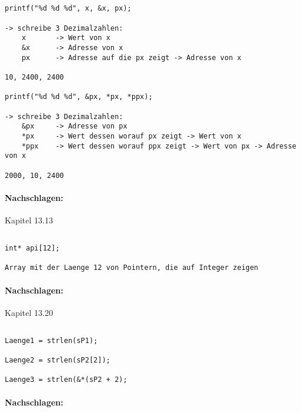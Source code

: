 \subsection{}
\begin{lstlisting}
printf("%d %d %d", x, &x, px);

-> schreibe 3 Dezimalzahlen:
	x 		-> Wert von x
	&x		-> Adresse von x
	px		-> Adresse auf die px zeigt -> Adresse von x
	
10, 2400, 2400

printf("%d %d %d", &px, *px, *ppx);

-> schreibe 3 Dezimalzahlen:
	&px 	-> Adresse von px
	*px		-> Wert dessen worauf px zeigt -> Wert von x
	*ppx	-> Wert dessen worauf ppx zeigt -> Wert von px -> Adresse von x
	
2000, 10, 2400
\end{lstlisting}
\paragraph*{Nachschlagen:}
Kapitel 13.13

\subsection{}
\begin{lstlisting}
int* api[12];

Array mit der Laenge 12 von Pointern, die auf Integer zeigen 
\end{lstlisting}
\paragraph*{Nachschlagen:}
Kapitel 13.20

\subsection{}
\begin{lstlisting}
Laenge1 = strlen(sP1);

Laenge2	= strlen(sP2[2]);

Laenge3	= strlen(&*(sP2 + 2);
\end{lstlisting}
\paragraph*{Nachschlagen:}